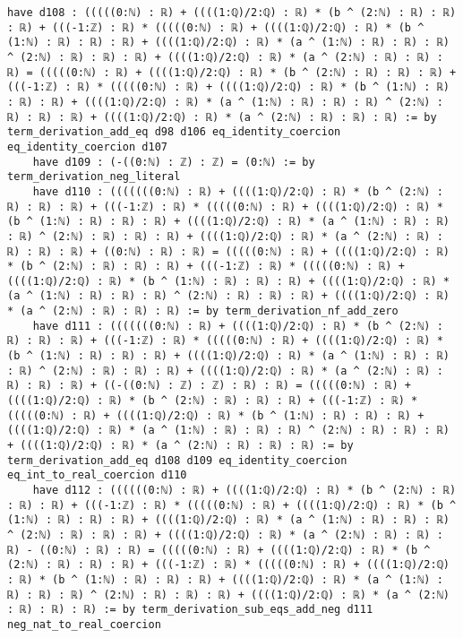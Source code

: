 \documentclass{article}
\begin{document}
\begin{tcolorbox}[colback=white!10, width=\linewidth]
\begin{lstlisting}[language=Lean4]
    have d108 : (((((0:ℕ) : ℝ) + ((((1:ℚ)/2:ℚ) : ℝ) * (b ^ (2:ℕ) : ℝ) : ℝ) : ℝ) + (((-1:ℤ) : ℝ) * (((((0:ℕ) : ℝ) + ((((1:ℚ)/2:ℚ) : ℝ) * (b ^ (1:ℕ) : ℝ) : ℝ) : ℝ) + ((((1:ℚ)/2:ℚ) : ℝ) * (a ^ (1:ℕ) : ℝ) : ℝ) : ℝ) ^ (2:ℕ) : ℝ) : ℝ) : ℝ) + ((((1:ℚ)/2:ℚ) : ℝ) * (a ^ (2:ℕ) : ℝ) : ℝ) : ℝ) = (((((0:ℕ) : ℝ) + ((((1:ℚ)/2:ℚ) : ℝ) * (b ^ (2:ℕ) : ℝ) : ℝ) : ℝ) + (((-1:ℤ) : ℝ) * (((((0:ℕ) : ℝ) + ((((1:ℚ)/2:ℚ) : ℝ) * (b ^ (1:ℕ) : ℝ) : ℝ) : ℝ) + ((((1:ℚ)/2:ℚ) : ℝ) * (a ^ (1:ℕ) : ℝ) : ℝ) : ℝ) ^ (2:ℕ) : ℝ) : ℝ) : ℝ) + ((((1:ℚ)/2:ℚ) : ℝ) * (a ^ (2:ℕ) : ℝ) : ℝ) : ℝ) := by term_derivation_add_eq d98 d106 eq_identity_coercion eq_identity_coercion d107
    have d109 : (-((0:ℕ) : ℤ) : ℤ) = (0:ℕ) := by term_derivation_neg_literal
    have d110 : (((((((0:ℕ) : ℝ) + ((((1:ℚ)/2:ℚ) : ℝ) * (b ^ (2:ℕ) : ℝ) : ℝ) : ℝ) + (((-1:ℤ) : ℝ) * (((((0:ℕ) : ℝ) + ((((1:ℚ)/2:ℚ) : ℝ) * (b ^ (1:ℕ) : ℝ) : ℝ) : ℝ) + ((((1:ℚ)/2:ℚ) : ℝ) * (a ^ (1:ℕ) : ℝ) : ℝ) : ℝ) ^ (2:ℕ) : ℝ) : ℝ) : ℝ) + ((((1:ℚ)/2:ℚ) : ℝ) * (a ^ (2:ℕ) : ℝ) : ℝ) : ℝ) : ℝ) + ((0:ℕ) : ℝ) : ℝ) = (((((0:ℕ) : ℝ) + ((((1:ℚ)/2:ℚ) : ℝ) * (b ^ (2:ℕ) : ℝ) : ℝ) : ℝ) + (((-1:ℤ) : ℝ) * (((((0:ℕ) : ℝ) + ((((1:ℚ)/2:ℚ) : ℝ) * (b ^ (1:ℕ) : ℝ) : ℝ) : ℝ) + ((((1:ℚ)/2:ℚ) : ℝ) * (a ^ (1:ℕ) : ℝ) : ℝ) : ℝ) ^ (2:ℕ) : ℝ) : ℝ) : ℝ) + ((((1:ℚ)/2:ℚ) : ℝ) * (a ^ (2:ℕ) : ℝ) : ℝ) : ℝ) := by term_derivation_nf_add_zero
    have d111 : (((((((0:ℕ) : ℝ) + ((((1:ℚ)/2:ℚ) : ℝ) * (b ^ (2:ℕ) : ℝ) : ℝ) : ℝ) + (((-1:ℤ) : ℝ) * (((((0:ℕ) : ℝ) + ((((1:ℚ)/2:ℚ) : ℝ) * (b ^ (1:ℕ) : ℝ) : ℝ) : ℝ) + ((((1:ℚ)/2:ℚ) : ℝ) * (a ^ (1:ℕ) : ℝ) : ℝ) : ℝ) ^ (2:ℕ) : ℝ) : ℝ) : ℝ) + ((((1:ℚ)/2:ℚ) : ℝ) * (a ^ (2:ℕ) : ℝ) : ℝ) : ℝ) : ℝ) + ((-((0:ℕ) : ℤ) : ℤ) : ℝ) : ℝ) = (((((0:ℕ) : ℝ) + ((((1:ℚ)/2:ℚ) : ℝ) * (b ^ (2:ℕ) : ℝ) : ℝ) : ℝ) + (((-1:ℤ) : ℝ) * (((((0:ℕ) : ℝ) + ((((1:ℚ)/2:ℚ) : ℝ) * (b ^ (1:ℕ) : ℝ) : ℝ) : ℝ) + ((((1:ℚ)/2:ℚ) : ℝ) * (a ^ (1:ℕ) : ℝ) : ℝ) : ℝ) ^ (2:ℕ) : ℝ) : ℝ) : ℝ) + ((((1:ℚ)/2:ℚ) : ℝ) * (a ^ (2:ℕ) : ℝ) : ℝ) : ℝ) := by term_derivation_add_eq d108 d109 eq_identity_coercion eq_int_to_real_coercion d110
    have d112 : ((((((0:ℕ) : ℝ) + ((((1:ℚ)/2:ℚ) : ℝ) * (b ^ (2:ℕ) : ℝ) : ℝ) : ℝ) + (((-1:ℤ) : ℝ) * (((((0:ℕ) : ℝ) + ((((1:ℚ)/2:ℚ) : ℝ) * (b ^ (1:ℕ) : ℝ) : ℝ) : ℝ) + ((((1:ℚ)/2:ℚ) : ℝ) * (a ^ (1:ℕ) : ℝ) : ℝ) : ℝ) ^ (2:ℕ) : ℝ) : ℝ) : ℝ) + ((((1:ℚ)/2:ℚ) : ℝ) * (a ^ (2:ℕ) : ℝ) : ℝ) : ℝ) - ((0:ℕ) : ℝ) : ℝ) = (((((0:ℕ) : ℝ) + ((((1:ℚ)/2:ℚ) : ℝ) * (b ^ (2:ℕ) : ℝ) : ℝ) : ℝ) + (((-1:ℤ) : ℝ) * (((((0:ℕ) : ℝ) + ((((1:ℚ)/2:ℚ) : ℝ) * (b ^ (1:ℕ) : ℝ) : ℝ) : ℝ) + ((((1:ℚ)/2:ℚ) : ℝ) * (a ^ (1:ℕ) : ℝ) : ℝ) : ℝ) ^ (2:ℕ) : ℝ) : ℝ) : ℝ) + ((((1:ℚ)/2:ℚ) : ℝ) * (a ^ (2:ℕ) : ℝ) : ℝ) : ℝ) := by term_derivation_sub_eqs_add_neg d111 neg_nat_to_real_coercion

\end{lstlisting}
\end{tcolorbox}
\end{document}
